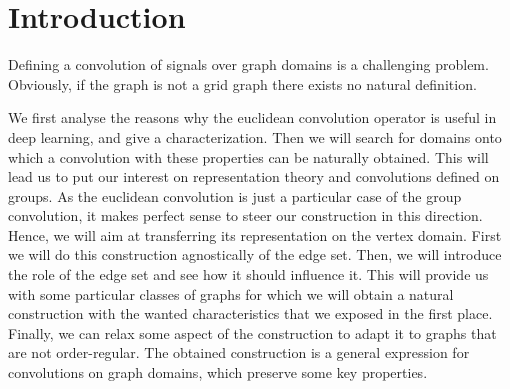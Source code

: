 \section*{Introduction}

Defining a convolution of signals over graph domains is a challenging problem. Obviously, if the graph is not a grid graph there exists no natural definition.

We first analyse the reasons why the euclidean convolution operator is useful in deep learning, and give a characterization. Then we will search for domains onto which a convolution with these properties can be naturally obtained. This will lead us to put our interest on representation theory and convolutions defined on groups. As the euclidean convolution is just a particular case of the group convolution, it makes perfect sense to steer our construction in this direction. Hence, we will aim at transferring its representation on the vertex domain. First we will do this construction agnostically of the edge set. Then, we will introduce the role of the edge set and see how it should influence it. This will provide us with some particular classes of graphs for which we will obtain a natural construction with the wanted characteristics that we exposed in the first place. Finally, we can relax some aspect of the construction to adapt it to graphs that are not order-regular. The obtained construction is a general expression for convolutions on graph domains, which preserve some key properties.